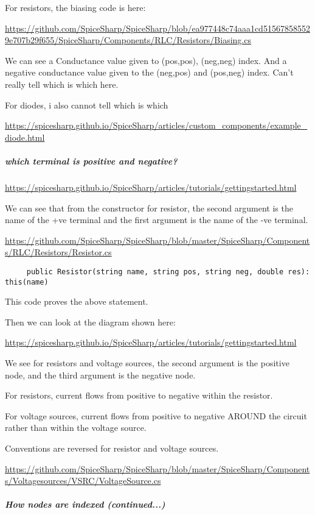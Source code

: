 \documentclass[12pt]{article}
\renewcommand{\_}{\kern-1.5pt\textunderscore\kern-1.5pt}
\begin{document}
For resistors, the biasing code is here:

\url{https://github.com/SpiceSharp/SpiceSharp/blob/ea977448c74aaa1cd515678585529e707b29f655/SpiceSharp/Components/RLC/Resistors/Biasing.cs}

We can see a Conductance value given to (pos,pos), (neg,neg) index. And a negative conductance value given to the (neg,pos) and (pos,neg) index. Can't really tell which is which here.

For diodes, i also cannot tell which is which

\url{https://spicesharp.github.io/SpiceSharp/articles/custom_components/example_diode.html}

\subparagraph{which terminal is positive and negative?}

\url{https://spicesharp.github.io/SpiceSharp/articles/tutorials/gettingstarted.html}

We can see that from the constructor for resistor, the second argument is the name of the +ve terminal and the first argument is the name of the -ve terminal.

\url{https://github.com/SpiceSharp/SpiceSharp/blob/master/SpiceSharp/Components/RLC/Resistors/Resistor.cs}

\begin{verbatim}
     public Resistor(string name, string pos, string neg, double res): this(name)
\end{verbatim}

This code proves the above statement.

Then we can look at the diagram shown here:

\url{https://spicesharp.github.io/SpiceSharp/articles/tutorials/gettingstarted.html}

We see for resistors and voltage sources, the second argument is the positive node, and the third argument is the negative node.

For resistors, current flows from positive to negative within the resistor.

For voltage sources, current flows from positive to negative AROUND the circuit rather than within the voltage source. 

Conventions are reversed for resistor and voltage sources. 

\url{https://github.com/SpiceSharp/SpiceSharp/blob/master/SpiceSharp/Components/Voltagesources/VSRC/VoltageSource.cs}

\subparagraph{How nodes are indexed (continued...)}
\end{document}
